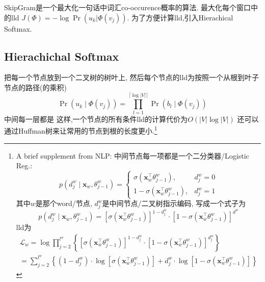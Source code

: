 \documentclass{article}
\begin{document}
SkipGram是一个最大化一句话中词汇co-occurence概率的算法. 最大化每个窗口中的lld $J(\Phi)=-\log \operatorname{Pr}(u_k|\Phi(v_j))$. 为了方便计算lld,引入Hierachical Softmax.

\subsection{Hierachichal Softmax}

把每一个节点放到一个二叉树的树叶上, 然后每个节点的lld为按照一个从根到叶子节点的路径(的乘积)
\begin{equation}
    \operatorname{Pr}\left(u_{k} \mid \Phi\left(v_{j}\right)\right)=\prod_{l=1}^{\lceil\log |V|\rceil} \operatorname{Pr}\left(b_{l} \mid \Phi\left(v_{j}\right)\right)
\end{equation}
中间每一层都是
这样,一个节点的所有条件lld的计算代价为$O(|V|\log |V|)$
还可以通过Huffman树来让常用的节点到根的长度更小.\footnote{
    A brief supplement from NLP:
    中间节点每一项都是一个二分类器/Logistic Reg.:
    \begin{equation}
        p\left(d_{j}^{w} \mid \mathbf{x}_{w}, \theta_{j-1}^{w}\right)=\left\{\begin{array}{ll}
        \sigma\left(\mathbf{x}_{w}^{\top} \theta_{j-1}^{w}\right), & d_{j}^{w}=0 \\
        1-\sigma\left(\mathbf{x}_{w}^{\top} \theta_{j-1}^{w}\right), & d_{j}^{w}=1
        \end{array}\right.
    \end{equation}
    其中$w$是那个word/节点, $d_j^w$是中间节点/二叉树指示编码, 写成一个式子为
    \begin{equation}
        p\left(d_{j}^{w} \mid \mathbf{x}_{w}, \theta_{j-1}^{w}\right)=\left[\sigma\left(\mathbf{x}_{w}^{\top} \theta_{j-1}^{w}\right)\right]^{1-d_{j}^{w}} \cdot\left[1-\sigma\left(\mathbf{x}_{w}^{\top} \theta_{j-1}^{w}\right)\right]^{d^{w}}
    \end{equation}
    lld为
    \begin{equation}
        \begin{array}{l}
        \mathcal{L}_w=\log \prod_{j=2}^{l^{w}}\left\{\left[\sigma\left(\mathbf{x}_{w}^{\top} \theta_{j-1}^{w}\right)\right]^{1-d_{j}^{w}} \cdot\left[1-\sigma\left(\mathbf{x}_{w}^{\top} \theta_{j-1}^{w}\right)\right]^{d_{j}^{w}}\right\} \\
        =\sum_{j=2}^{l^{w}}\left\{\left(1-d_{j}^{w}\right) \cdot \log \left[\sigma\left(\mathbf{x}_{w}^{\top} \theta_{j-1}^{w}\right)\right]+d_{j}^{w} \cdot \log \left[1-\sigma\left(\mathbf{x}_{w}^{\top} \theta_{j-1}^{w}\right)\right]\right\}
        \end{array}
    \end{equation}
}
\end{document}
